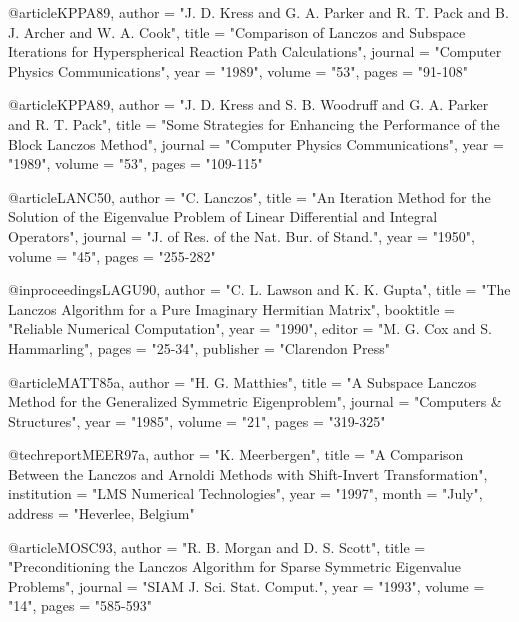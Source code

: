@article{KPPA89,
   author       = "J. D. Kress and G. A. Parker and R. T. Pack and
                   B. J. Archer and W. A. Cook",
   title        = "{Comparison of Lanczos and Subspace Iterations
                   for Hyperspherical Reaction Path Calculations}",
   journal      = "Computer Physics Communications",
   year         = "1989",
   volume       = "53",
   pages        = "91-108"}

@article{KPPA89,
   author       = "J. D. Kress and S. B. Woodruff and 
                   G. A. Parker and R. T. Pack",
   title        = "{Some Strategies for Enhancing the Performance
                   of the Block Lanczos Method}",
   journal      = "Computer Physics Communications",
   year         = "1989",
   volume       = "53",
   pages        = "109-115"}

@article{LANC50,
   author       = "C. Lanczos",
   title        = "{An Iteration Method for the Solution of the
                   Eigenvalue Problem of Linear Differential 
                   and Integral Operators}",
   journal      = "J. of Res. of the Nat. Bur. of Stand.",
   year         = "1950",
   volume       = "45",
   pages        = "255-282"}

@inproceedings{LAGU90,
   author       = "C. L. Lawson and K. K. Gupta",
   title        = "{The Lanczos Algorithm for a Pure
                   Imaginary Hermitian Matrix}",
   booktitle    = "Reliable Numerical Computation",
   year         = "1990",
   editor       = "M. G. Cox and S. Hammarling",
   pages        = "25-34",
   publisher    = "Clarendon Press"}

@article{MATT85a,
   author       = "H. G. Matthies",       
   title        = "{A Subspace Lanczos Method for the Generalized
                   Symmetric Eigenproblem}",
   journal      = "Computers \& Structures",        
   year         = "1985",
   volume       = "21",
   pages        = "319-325"}

@techreport{MEER97a,
   author       = "K. Meerbergen",
   title        = "{A Comparison Between the Lanczos and Arnoldi
                   Methods with Shift-Invert Transformation}",
   institution  = "LMS Numerical Technologies",
   year         = "1997",
   month        = "July",
   address      = "Heverlee, Belgium"} 

@article{MOSC93,
   author       = "R. B. Morgan and D. S. Scott",       
   title        = "{Preconditioning the Lanczos Algorithm for
                   Sparse Symmetric Eigenvalue Problems}",
   journal      = "SIAM J. Sci. Stat. Comput.",
   year         = "1993",
   volume       = "14",
   pages        = "585-593"}

